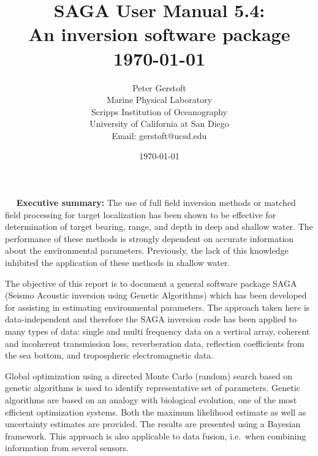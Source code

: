 \documentclass{saclantc}
\title{SAGA User Manual 5.4:\\
An inversion software package\\ 
{\large \today}}
\author{\center Peter Gerstoft\\
           Marine Physical Laboratory \\
Scripps Institution of Oceanography\\
           University of California at San Diego\\
Email: gerstoft@ucsd.edu}
\date{\today}
\begin{document}
\begin{prelims}
~~
\newpage
{\bf Executive summary:}
The use of full field inversion methods or matched field processing
for target localization has been shown to be effective for
determination of target bearing, range, and depth in deep and shallow water. The performance of
these methods is strongly dependent on accurate information
about the environmental parameters. Previously, the lack of this
knowledge  inhibited the application of these methods in shallow water. 

The objective of this
report is to document a general software package {\sf SAGA} ({\sf S}eismo
{\sf A}coustic inversion using {\sf G}enetic {\sf A}lgorithms) which
has been developed
for assisting in estimating environmental parameters.
The approach taken here is data-independent and therefore the {\sf
SAGA} inversion code has
been applied to many types of data: single and multi
frequency data on a vertical array, coherent and incoherent
transmission loss, reverberation data, reflection coefficients from the
sea bottom, and tropospheric electromagnetic data.


Global
optimization using a directed Monte Carlo (random) search based on genetic
algorithms is used to identify representative set of parameters. 
Genetic algorithms are based on an analogy with
biological evolution, one of the most efficient optimization systems. 
Both the maximum likelihood estimate as well as uncertainty
estimates are provided. The results are presented using a Bayesian
framework. This approach is also applicable to data 
fusion, i.e.\ when combining information from several sensors.

 
\newpage


\end{prelims}
\end{document}
